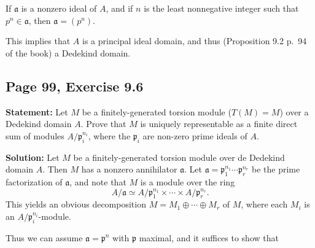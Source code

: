\documentclass[parskip=half,fontsize=12pt]{scrartcl}%
\newcommand{\mf}{\mathfrak}
\newcommand{\aaa}{\mf a}
\newcommand{\mmm}{\mf m}
\newcommand{\ppp}{\mf p}
\newcommand{\epi}{\twoheadrightarrow}
\begin{document}
If $\aaa$ is a nonzero ideal of $A$, and if $n$ is the least nonnegative integer such that $p^n\in\aaa$, %
then $\aaa=(p^n)$. 

This implies that $A$ is a principal ideal domain, and thus (Proposition 9.2 p.~94 of the book) a Dedekind domain.





\subsection{Page 99, Exercise 9.6}%

\textbf{Statement:} Let $M$ be a finitely-generated torsion module ($T(M)=M$) over a Dedekind domain $A$. Prove that $M$ is uniquely representable as a finite direct sum of modules $A/\ppp_i^{n_i}$, where the $\ppp_i$ are non-zero prime ideals of $A$.

\textbf{Solution:} Let $M$ be a finitely-generated torsion module over de Dedekind domain $A$. Then $M$ has a nonzero annihilator $\aaa$. Let $\aaa=\ppp_1^{n_1}\cdots\ppp_r^{n_r}$ be the prime factorization of $\aaa$, and note that $M$ is a module over the ring 
$$
A/\aaa\simeq A/\ppp_1^{n_1}\times\cdots\times A/\ppp_r^{n_r}. 
$$ 
This yields an obvious decomposition $M=M_1\oplus\cdots\oplus M_r$ of $M$, where each $M_i$ is an $A/\ppp_i^{n_i}$-module. 

Thus we can assume $\aaa=\ppp^n$ with $\ppp$ maximal, and it suffices to show that 
\end{document}
